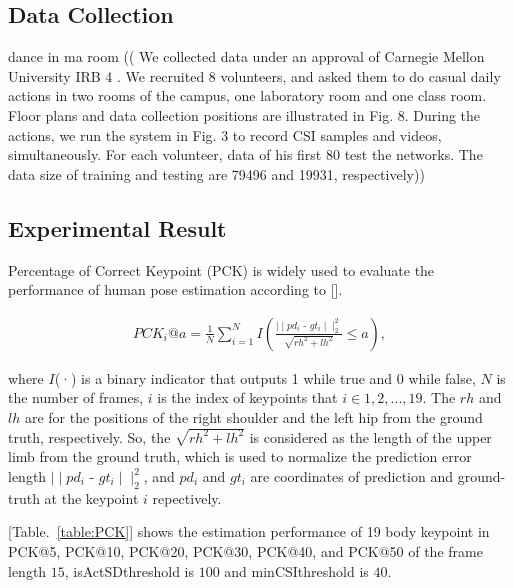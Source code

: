 \documentclass[conference]{IEEEtran}
\begin{document}
	\subsection{Data Collection}
	dance in ma room
	((
	We collected data under an approval of Carnegie Mellon University IRB 4
	. We recruited 8 volunteers,
	and asked them to do casual daily actions in two rooms of the campus, one laboratory room and one
	class room. Floor plans and data collection positions are illustrated in Fig. 8. During the actions, we
	run the system in Fig. 3 to record CSI samples and videos, simultaneously. For each volunteer, data
	of his first 80%
	test the networks. The data size of training and testing are 79496 and 19931, respectively))
	
	
	\subsection{Experimental Result}
	Percentage of Correct Keypoint (PCK) is widely used to evaluate the performance of human pose estimation according to [].

	\begin{equation}
	\begin{aligned}
	PCK_i@a = \frac{1}{N} \sum_{i=1}^{N}
	I(
	\frac{\mid \mid  pd_i \text{ - } gt_i \mid \mid^2_2}{\sqrt{rh^2+lh^2}}  \le a ),
	\label{eq:PCK}
	\end{aligned}
	\end{equation}
	
	
	where $I$(·) is a binary indicator that outputs 1 while true and 0 while false, 
	$N$ is the number of frames, $i$ is the index of keypoints that $i \in {1, 2, ..., 19}$. The $rh$ and
	$lh$ are for the positions of the right shoulder and the left hip from the ground truth, respectively.
	So, the ${\sqrt{rh^2+lh^2}}$ is  considered as the length of the upper limb from the ground truth, which is used to normalize the prediction error length
	$ \mid \mid pd_i \text{ - } gt_i \mid \mid _2^2$, and $pd_i$ and $gt_i$ are coordinates of prediction and ground-truth at the keypoint $i$ repectively.
	
	
	[Table.~\ref{table:PCK}] shows the estimation performance of 19 body keypoint in PCK@5, PCK@10, PCK@20,
	PCK@30, PCK@40, and PCK@50 of the frame length $15$, isActSDthreshold is $100$ and minCSIthreshold is $40$.
	
	
	
	
	
\end{document}
